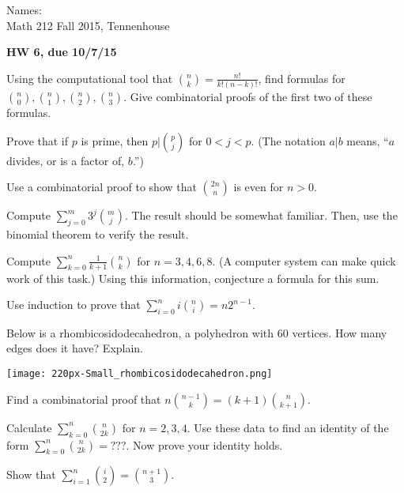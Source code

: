 \documentclass[12pt,letterpaper]{exam}
\begin{document}
\setlength{\pdfpageheight}{\paperheight}
\setlength{\pdfpagewidth}{\paperwidth}

\newcommand{\ud}{\,\mathrm{d}}
\pointsinmargin

Names: \underline{\hspace{6in}}\\
Math 212 Fall 2015, Tennenhouse \\


\begin{center}
\textbf{HW 6, due 10/7/15}\\
\end{center}


\begin{questions}


\question[6,4]
Using the computational tool that $\binom{n}{k}=\frac{n!}{k!(n-k)!}$, find formulas for $\binom{n}{0},\binom{n}{1},\binom{n}{2},\binom{n}{3}$. Give combinatorial proofs of the first two of these formulas.

\question[6,5]
Prove that if $p$ is prime, then $p|\binom{p}{j}$ for $0<j<p$. (The notation $a|b$ means, ``$a$ divides, or is a factor of, $b$.'')

\question[6,7]
Use a combinatorial proof to show that $\binom{2n}{n}$ is even for $n>0$.

\question[6,9]
Compute $\sum \limits_{j=0}^{m} 3^j \binom{m}{j}$. The result should be somewhat familiar. Then, use the binomial theorem to verify the result.

\question[6,11]
Compute $\sum \limits_{k=0}^{n} \frac{1}{k+1} \binom{n}{k}$ for $n=3,4,6,8$. (A computer system can make quick work of this task.) Using this information, conjecture a formula for this sum.

\question[6,12]
Use induction to prove that $\sum \limits_{i=0}^{n} i \binom{n}{i} = n2^{n-1}$.

\question[6,15]
Below is a rhombicosidodecahedron, a polyhedron with $60$ vertices. How many edges does it have? Explain.
\begin{center}
\texttt{[image: 220px-Small\_rhombicosidodecahedron.png]}
\end{center}

\question[6,17]
Find a combinatorial proof that $n \binom{n-1}{k}=(k+1) \binom{n}{k+1}$.

\question[6,20]
Calculate $\sum \limits_{k=0}^{n} \binom{n}{2k}$ for $n=2,3,4$. Use these data to find an identity of the form $\sum \limits_{k=0}^{n} \binom{n}{2k} = ???$. Now prove your identity holds.

\question[6,22] 
Show that $\sum \limits_{i=1}^{n} \binom {i}{2}= \binom{n+1}{3}$. 


\end{questions}
\end{document}
